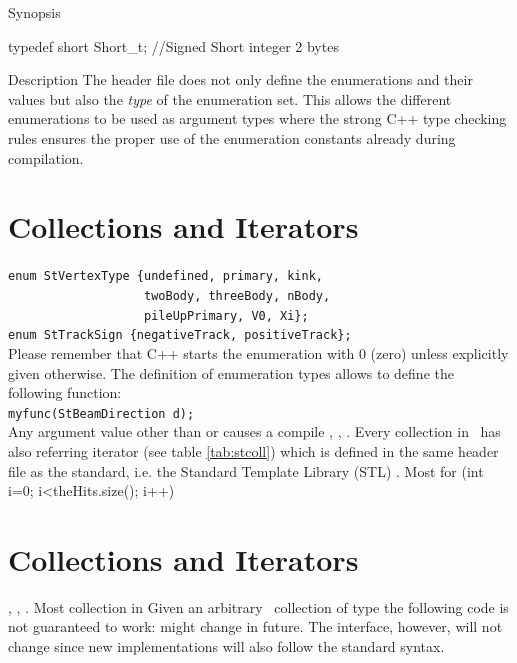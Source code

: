 \begin{enumerate}
\begin{center}
\item[Synopsis]
    

typedef short          Short_t;     //Signed Short integer 2 bytes
\item[Description]
    The header file does not only define the enumerations and their values
    but also the \textit{type} of the enumeration set. This allows the
    different enumerations to be used as argument types where the strong C++ type
    checking rules ensures the proper use of the enumeration constants already
    during compilation.

\section{Collections and Iterators}  
    \verb+enum StVertexType {undefined, primary, kink,+\\
    \verb+                   twoBody, threeBody, nBody,+\\
    \verb+                   pileUpPrimary, V0, Xi};+\\

    \verb+enum StTrackSign {negativeTrack, positiveTrack};+\\

    Please remember that C++ starts the enumeration with 0 (zero) unless
    explicitly given otherwise. The definition of enumeration types allows
    to define the following function:\\
    \verb+myfunc(StBeamDirection d);+\\
    Any argument value other than  or  causes a compile
, , .  Every collection in
\StEvent\ has also referring iterator (see table \ref{tab:stcoll})
which is defined in the same header file as the
standard, i.e. the Standard Template Library (STL) . Most
for (int i=0; i<theHits.size(); i++) {

\section{Collections and Iterators}
\label{sec:collections}
\label{sec:collections}
, , .  Most collection in
Given an arbitrary \StEvent\ collection  of type 
 the following code is not guaranteed to work:
might change in future. The interface, however, will not change since
new implementations will also follow the standard syntax.

}
\end{center}
\end{enumerate}
